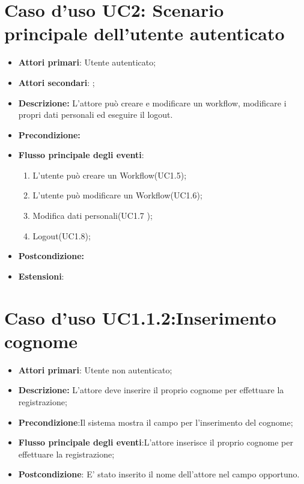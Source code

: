 \section{Caso d'uso UC2: Scenario principale dell'utente autenticato}
\begin{itemize}
	\item \textbf{Attori primari}: Utente autenticato;
	\item \textbf{Attori secondari}: ;
	\item \textbf{Descrizione:} L'attore può creare e modificare un workflow, modificare i propri dati personali ed eseguire il logout.
	\item \textbf{Precondizione:}
	\item \textbf{Flusso principale degli eventi}:
	\begin{enumerate}
		\item L'utente può creare un Workflow(UC1.5);
		\item L'utente può modificare un Workflow(UC1.6);
		\item Modifica dati personali(UC1.7 );
		\item Logout(UC1.8);
	\end{enumerate}
	\item \textbf{Postcondizione:} 
	\item \textbf{Estensioni}:

\end{itemize}



\section{Caso d'uso UC1.1.2:Inserimento cognome}
\begin{itemize}
	\item \textbf{Attori primari}: Utente non autenticato;
	\item \textbf{Descrizione:} L'attore deve inserire il proprio cognome per effettuare la registrazione;
	\item \textbf{Precondizione}:Il sistema mostra il campo per l'inserimento del cognome;
	\item \textbf{Flusso principale degli eventi}:L'attore inserisce il proprio cognome per effettuare la registrazione;
	\item \textbf{Postcondizione}: E' stato inserito il nome dell'attore nel campo opportuno.
\end{itemize}

